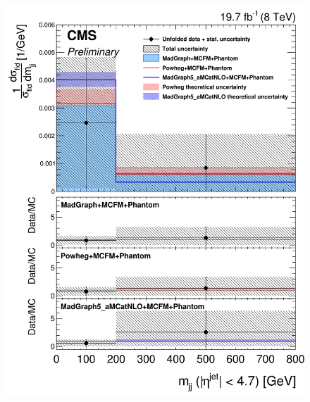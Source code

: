 \begin{figure}[hbtp]
  \begin{center}
    \includegraphics[width=\cmsFigWidth]{Figures/DiffCrossSecZZTo4mMjj_Unfolded_fr_MadGraph_norm.png}     

\end{center}
\end{figure}
